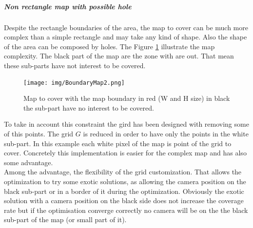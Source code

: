  \subparagraph{Non rectangle map with possible hole} \label{subPara:MapConstraintAndObstacle}
Despite the rectangle boundaries of the area, the map to cover can be much more complex than a simple rectangle and may take any kind of shape. Also the shape of the area can be composed by holes. The Figure \ref{fig:boundaryMap} illustrate the map complexity. The black part of the map are the zone with are out. That mean these sub-parts have not interest to be covered.
 \begin{figure}[t!]
 \begin{center}
   \texttt{[image: img/BoundaryMap2.png]}
  \caption{Map to cover with the map boundary in red (W and H size) in black the sub-part have no interest to  be covered.   }\label{fig:boundaryMap}
  \endminipage\hfill
  \end{center}
\end{figure}
To take in account this constraint the gird has been designed with removing some of this points.
The grid $G$ is reduced in order to have only the points in the white sub-part. In this example each white pixel of the map is point of the grid to cover. 
Concretely this implementation is easier for the complex map and has also some advantage. \\
Among the advantage, the flexibility of the grid customization. That allows the optimization to try some exotic solutions, as allowing the camera position on the black sub-part or in a border of it during the optimization.  Obviously the exotic solution with a camera position on the black side does not increase the coverage rate  but if the optimisation converge correctly no camera will be on the the black sub-part of the map (or small part of it).
%


